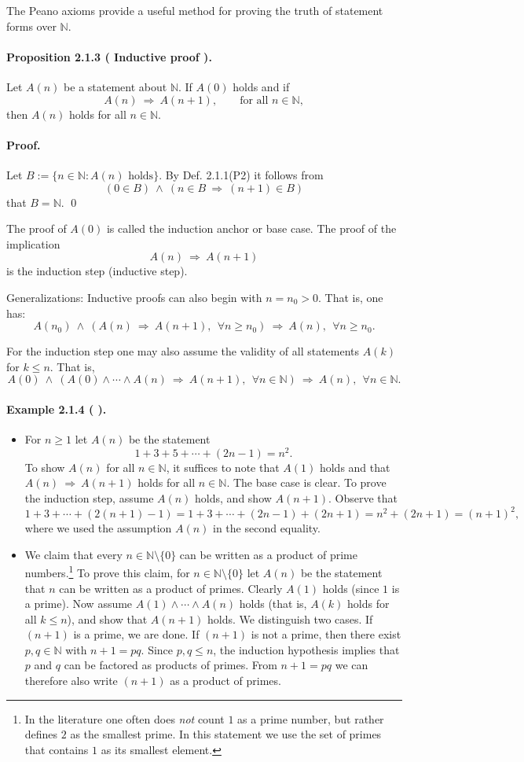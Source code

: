 \documentclass[12pt,a4paper]{article}
\newcommand{\N}{\mathbb{N}}
\newcommand{\NumberedExample}[3]{%
\paragraph*{Example #1 ( #2 ).} #3\par}
\newcommand{\NumberedProposition}[3]{%
\paragraph*{Proposition #1 ( #2 ).} #3\par}
\theoremstyle{plain}
\theoremstyle{definition}
\theoremstyle{remark}
\begin{document}
The Peano axioms provide a useful method for proving the truth of statement forms over $\N$.

\NumberedProposition{2.1.3}{Inductive proof}{Let $A(n)$ be a statement about $\N$. If $A(0)$ holds and if
\[
	A(n) \ \Longrightarrow\ A(n+1), \qquad \text{for all } n\in\N,
\]
then $A(n)$ holds for all $n\in\N$.}

\paragraph{Proof.} Let $B:=\{ n\in\N : A(n) \text{ holds}\}$. By Def. 2.1.1(P2) it follows from
\[
	(0\in B) \ \wedge\ (n\in B \ \Longrightarrow\ (n+1)\in B)
\]
that $B=\N$. \qed

The proof of $A(0)$ is called the induction anchor or base case. The proof of the implication
\[
	A(n) \ \Longrightarrow\ A(n+1)
\]
is the induction step (inductive step).

Generalizations: Inductive proofs can also begin with $n=n_0>0$. That is, one has:
\[
	A(n_0)\ \wedge\ (A(n)\ \Longrightarrow\ A(n+1),\ \ \forall n\ge n_0)\ \Longrightarrow\ A(n),\ \ \forall n\ge n_0.
\]

For the induction step one may also assume the validity of all statements $A(k)$ for $k\le n$. That is,
\[
	A(0)\ \wedge\ (A(0)\wedge\cdots\wedge A(n)\ \Longrightarrow\ A(n+1),\ \ \forall n\in\N)\ \Longrightarrow\ A(n),\ \ \forall n\in\N.
\]

\NumberedExample{2.1.4}{}{\begin{itemize}[leftmargin=*]
	\item For $n\ge 1$ let $A(n)$ be the statement
	\[
		1+3+5+\cdots+(2n-1) = n^2.
	\]
	To show $A(n)$ for all $n\in\N$, it suffices to note that $A(1)$ holds and that $A(n)\ \Longrightarrow\ A(n+1)$ holds for all $n\in\N$. The base case is clear. To prove the induction step, assume $A(n)$ holds, and show $A(n+1)$. Observe that
	\[
		1+3+\cdots+(2(n+1)-1)
			= 1+3+\cdots+(2n-1)+(2n+1)
			= n^2 + (2n+1)
			= (n+1)^2,
	\]
	where we used the assumption $A(n)$ in the second equality.

	\item We claim that every $n\in\N\setminus\{0\}$ can be written as a product of prime numbers.\footnote{In the literature one often does \emph{not} count $1$ as a prime number, but rather defines $2$ as the smallest prime. In this statement we use the set of primes that contains $1$ as its smallest element.} To prove this claim, for $n\in\N\setminus\{0\}$ let $A(n)$ be the statement that $n$ can be written as a product of primes. Clearly $A(1)$ holds (since $1$ is a prime). Now assume $A(1)\land\cdots\land A(n)$ holds (that is, $A(k)$ holds for all $k\le n$), and show that $A(n+1)$ holds. We distinguish two cases. If $(n+1)$ is a prime, we are done. If $(n+1)$ is not a prime, then there exist $p,q\in\N$ with $n+1=pq$. Since $p,q\le n$, the induction hypothesis implies that $p$ and $q$ can be factored as products of primes. From $n+1=pq$ we can therefore also write $(n+1)$ as a product of primes.
\end{itemize}}
\end{document}
